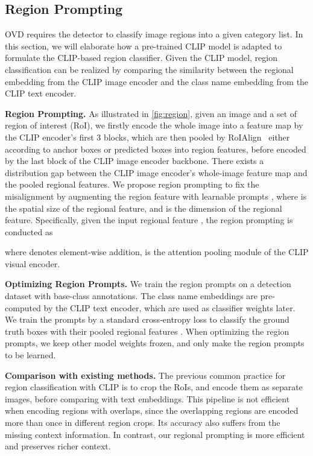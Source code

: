 \documentclass[10pt,twocolumn,letterpaper]{article}
\begin{document}
\subsection{Region Prompting}
\label{sec:region_prompting}
OVD requires the detector to classify image regions into a given category list.
In this section, we will elaborate how a pre-trained CLIP model is adapted to formulate the CLIP-based region classifier.
Given the CLIP model, region classification can be realized by comparing the similarity between the regional embedding from the CLIP image encoder and the class name embedding from the CLIP text encoder.

\noindent\textbf{Region Prompting.}
As illustrated in \cref{fig:region}, given an image and a set of region of interest (RoI), we firstly encode the whole image into a feature map by the CLIP encoder's first 3 blocks, which are then pooled by RoIAlign~\cite{fasterrcnn} either according to anchor boxes or predicted boxes into region features, before encoded by the last block of the CLIP image encoder backbone.
There exists a distribution gap between the CLIP image encoder's whole-image feature map and the pooled regional features.
We propose region prompting to fix the misalignment by augmenting the region feature with learnable prompts , where  is the spatial size of the regional feature, and  is the dimension of the regional feature.
Specifically, given the input regional feature , the region prompting is conducted as

where  denotes element-wise addition,  is the attention pooling module of the CLIP visual encoder.

\noindent\textbf{Optimizing Region Prompts.}
We train the region prompts on a detection dataset with base-class annotations.
The class name embeddings are pre-computed by the CLIP text encoder, which are used as classifier weights later.
We train the prompts by a standard cross-entropy loss to classify the ground truth boxes with their pooled regional features .
When optimizing the region prompts, we keep other model weights frozen, and only make the region prompts to be learned. 

\noindent\textbf{Comparison with existing methods.}
The previous common practice for region classification with CLIP is to crop the RoIs, and encode them as separate images, before comparing with text embeddings.
This pipeline is not efficient when encoding regions with overlaps, since the overlapping regions are encoded more than once in different region crops.
Its accuracy also suffers from the missing context information.
In contrast, our regional prompting is more efficient and preserves richer context.
\end{document}
